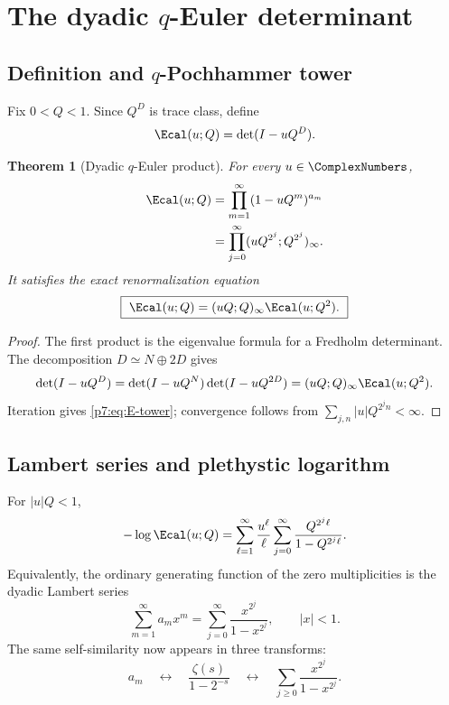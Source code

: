 \documentclass[11pt]{article}
\numberwithin{equation}{section}
\newtheorem{theorem}{Theorem}[section]
\theoremstyle{definition}
\theoremstyle{remark}
\begin{document}
\section{The dyadic $q$-Euler determinant}

\subsection{Definition and $q$-Pochhammer tower}

Fix $0<Q<1$.  Since $Q^D$ is trace class, define
\begin{equation}\label{p7:eq:E-def}
 \Ecal(u;Q)=\det(I-uQ^D).
\end{equation}

\begin{theorem}[Dyadic $q$-Euler product]\label{p7:thm:E-product}
For every $u\in\ComplexNumbers$,
\begin{align}
 \Ecal(u;Q)
 &=\prod_{m=1}^{\infty}(1-uQ^m)^{a_m}\label{p7:eq:E-mult}\\
 &=\prod_{j=0}^{\infty}(uQ^{2^j};Q^{2^j})_\infty.\label{p7:eq:E-tower}
\end{align}
It satisfies the exact renormalization equation
\begin{equation}\label{p7:eq:E-scale}
 \boxed{\ \Ecal(u;Q)=(uQ;Q)_\infty\Ecal(u;Q^2).\ }
\end{equation}
\end{theorem}

\begin{proof}
The first product is the eigenvalue formula for a Fredholm determinant.  The decomposition $D\simeq N\oplus2D$ gives
\[
 \det(I-uQ^D)=\det(I-uQ^N)\det(I-uQ^{2D})
 =(uQ;Q)_\infty\Ecal(u;Q^2).
\]
Iteration gives \cref{p7:eq:E-tower}; convergence follows from $\sum_{j,n}|u|Q^{2^jn}<\infty$.
\end{proof}

\subsection{Lambert series and plethystic logarithm}

For $|u|Q<1$,
\begin{equation}\label{p7:eq:E-log}
 -\log\Ecal(u;Q)
 =\sum_{\ell=1}^{\infty}\frac{u^\ell}{\ell}
 \sum_{j=0}^{\infty}\frac{Q^{2^j\ell}}{1-Q^{2^j\ell}}.
\end{equation}
Equivalently, the ordinary generating function of the zero multiplicities is the dyadic Lambert series
\begin{equation}\label{p7:eq:a-ogf}
 \boxed{\ \sum_{m=1}^{\infty}a_mx^m
 =\sum_{j=0}^{\infty}\frac{x^{2^j}}{1-x^{2^j}},\qquad |x|<1.\ }
\end{equation}
The same self-similarity now appears in three transforms:
\[
 a_m\quad\longleftrightarrow\quad
 \frac{\zeta(s)}{1-2^{-s}}
 \quad\longleftrightarrow\quad
 \sum_{j\ge0}\frac{x^{2^j}}{1-x^{2^j}}.
\]
\end{document}
